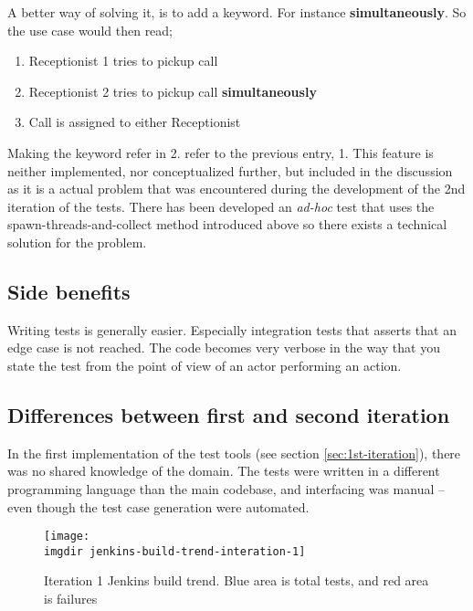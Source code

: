 A better way of solving it, is to add a keyword. For instance \textbf{simultaneously}. So the use case would then read;
\begin{enumerate}
 \item Receptionist 1 tries to pickup call
 \item Receptionist 2 tries to pickup call \textbf{simultaneously}
 \item Call is assigned to either Receptionist
\end{enumerate}
Making the keyword refer in 2. refer to the previous entry, 1. This feature is neither implemented, nor conceptualized further, but included in the discussion as it is a actual problem that was encountered during the development of the 2nd iteration of the tests. There has been developed an \emph{ad-hoc} test that uses the spawn-threads-and-collect method introduced above so there exists a technical solution for the problem.

\subsection{Side benefits}

Writing tests is generally easier. Especially integration tests that asserts that an edge case is not reached. The code becomes very verbose in the way that you state the test from the point of view of an actor performing an action.


\subsection{Differences between first and second iteration}
In the first implementation of the test tools (see section \ref{sec:1st-iteration}), there was no shared knowledge of the domain. The tests were written in a different programming language than the main codebase, and interfacing was manual -- even though the test case generation were automated.
\begin{figure}[!hbpt]
\centering
\texttt{[image: \\imgdir jenkins-build-trend-interation-1]}
\caption{Iteration 1 Jenkins build trend. Blue area is total tests, and red area is failures}
\label{fig:jenkins-build-trend-interation-1}
\end{figure}


